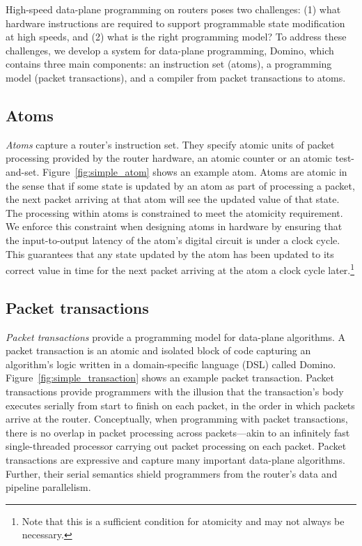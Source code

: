 High-speed data-plane programming on routers poses two challenges: (1) what hardware
instructions are required to support programmable state modification at high
speeds, and (2) what is the right programming model? To address these
challenges, we develop a system for data-plane programming, Domino, which
contains three main components: an instruction set (atoms), a programming model
(packet transactions), and a compiler from packet transactions to atoms.

\subsection{Atoms}
\label{ss:intro_atoms}
\textit{Atoms} capture a router's instruction set. They specify atomic units of
packet processing provided by the router hardware, \eg an atomic counter or an
atomic test-and-set. Figure~\ref{fig:simple_atom} shows an example atom. Atoms
are atomic in the sense that if some state is updated by an atom as part of
processing a packet, the next packet arriving at that atom will see the updated
value of that state. The processing within atoms is constrained to meet the
atomicity requirement. We enforce this constraint when designing atoms in
hardware by ensuring  that the input-to-output latency of the atom's digital
circuit is under a clock cycle. This guarantees that any state updated by the
atom has been updated to its correct value in time for the next packet arriving
at the atom a clock cycle later.\footnote{Note that this is a sufficient
condition for atomicity and may not always be necessary.}

\subsection{Packet transactions} \textit{Packet transactions} provide a
programming model for data-plane algorithms. A packet transaction is an atomic
and isolated block of code capturing an algorithm's logic written in a
domain-specific language (DSL) called Domino.
Figure~\ref{fig:simple_transaction} shows an example packet transaction.
Packet transactions provide programmers with the illusion that the
transaction's body executes serially from start to finish on each packet, in
the order in which packets arrive at the router. Conceptually, when programming
with packet transactions, there is no overlap in packet processing across
packets---akin to an infinitely fast single-threaded processor carrying out
packet processing on each packet. Packet transactions are expressive and
capture many important data-plane algorithms.  Further, their serial semantics
shield programmers from the router's data and pipeline parallelism.

